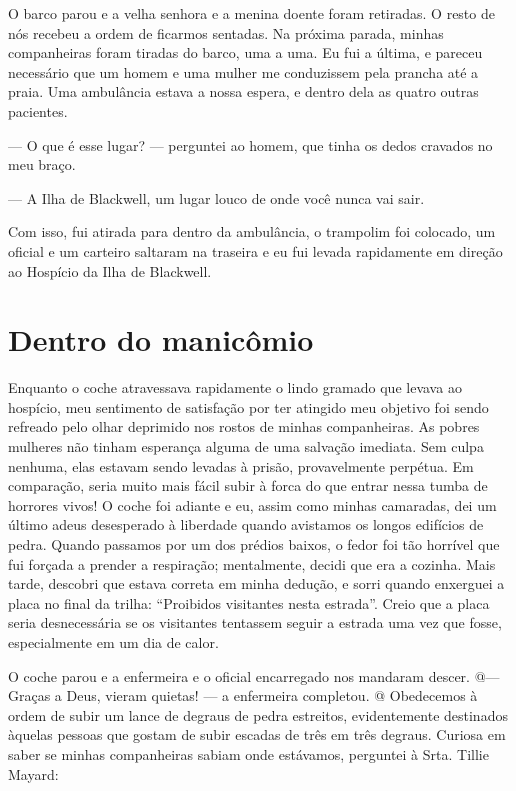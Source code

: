 O
barco parou e a velha senhora e a menina doente foram retiradas. O resto
de nós recebeu a ordem de ficarmos sentadas. Na próxima parada, minhas
companheiras foram tiradas do barco, uma a uma. Eu fui a última, e
pareceu necessário que um homem e uma mulher me conduzissem pela prancha
até a praia. Uma ambulância estava a nossa espera, e dentro dela as
quatro outras pacientes.

--- O que é esse lugar? --- perguntei ao homem, que tinha os dedos
cravados no meu braço.

--- A Ilha de Blackwell, um lugar louco de onde você nunca vai sair.

Com isso, fui atirada para dentro da ambulância, o trampolim foi
colocado, um oficial e um carteiro saltaram na traseira e eu fui levada
rapidamente em direção ao Hospício da Ilha de Blackwell.

\chapter{Dentro do
manicômio}\label{capuxedtulo-viii-dentro-do-manicuxf4mio}

Enquanto o coche atravessava rapidamente o lindo gramado que levava ao
hospício, meu sentimento de satisfação por ter atingido meu objetivo foi
sendo refreado pelo olhar deprimido nos rostos de minhas companheiras.
As pobres mulheres não tinham esperança alguma de uma salvação imediata.
Sem culpa nenhuma, elas estavam sendo levadas à prisão, provavelmente
perpétua. Em comparação, seria muito mais fácil subir à forca do que
entrar nessa tumba de horrores vivos! O coche foi adiante e eu, assim
como minhas camaradas, dei um último adeus desesperado à liberdade
quando avistamos os longos edifícios de pedra. Quando passamos por um
dos prédios baixos, o fedor foi tão horrível que fui forçada a prender a
respiração; mentalmente, decidi que era a cozinha. Mais tarde, descobri
que estava correta em minha dedução, e sorri quando enxerguei a placa no
final da trilha: ``Proibidos visitantes nesta estrada''. Creio que a
placa seria desnecessária se os visitantes tentassem seguir a estrada
uma vez que fosse, especialmente em um dia de calor.

O coche parou e a enfermeira e o oficial encarregado nos mandaram
descer. @--- Graças a Deus, vieram quietas! --- a enfermeira completou.
@ Obedecemos à ordem de subir um lance de degraus de pedra estreitos,
evidentemente destinados àquelas pessoas que gostam de subir escadas de
três em três degraus. Curiosa em saber se minhas companheiras sabiam
onde estávamos, perguntei à Srta. Tillie Mayard:

